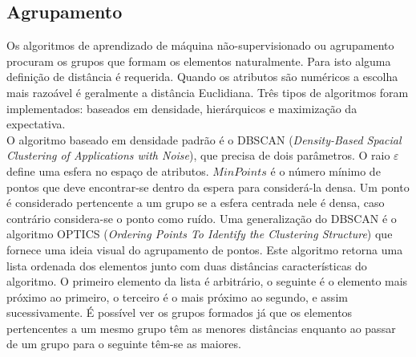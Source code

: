 \documentclass[a4paper,openright,12pt]{report} %
\begin{document}
\subsection{Agrupamento}

Os algoritmos de aprendizado de m\'aquina n\~ao-supervisionado ou agrupamento procuram os grupos que formam os elementos naturalmente. Para isto alguma defini\c c\~ao de dist\^ancia \'e requerida. Quando os atributos s\~ao num\'ericos a escolha mais razo\'avel \'e geralmente a dist\^ancia Euclidiana. Tr\^es tipos de algoritmos foram implementados: baseados em densidade, hier\'arquicos e maximiza\c c\~ao da expectativa.\\

O algoritmo baseado em densidade padr\~ao \'e o DBSCAN (\textit{Density-Based Spacial Clustering of Applications with Noise}), que precisa de dois par\^ametros. O raio $\varepsilon$ define uma esfera no espa\c co de atributos. $MinPoints$ \'e o n\'umero m\'inimo de pontos que deve encontrar-se dentro da espera para consider\'a-la densa. Um ponto \'e considerado pertencente a um grupo se a esfera centrada nele \'e densa, caso contr\'ario considera-se o ponto como ru\'ido. Uma generaliza\c c\~ao do DBSCAN \'e o algoritmo OPTICS (\textit{Ordering Points To Identify the Clustering Structure}) que fornece uma ideia visual do agrupamento de pontos. Este algoritmo retorna uma lista ordenada dos elementos junto com duas dist\^ancias caracter\'isticas do algoritmo. O primeiro elemento da lista \'e arbitr\'ario, o seguinte \'e o elemento mais pr\'oximo ao primeiro, o terceiro \'e o mais pr\'oximo ao segundo, e assim sucessivamente. \'E poss\'ivel ver os grupos formados j\'a que os elementos pertencentes a um mesmo grupo t\^em as menores dist\^ancias enquanto ao passar de um grupo para o seguinte t\^em-se as maiores.\\
\end{document}
